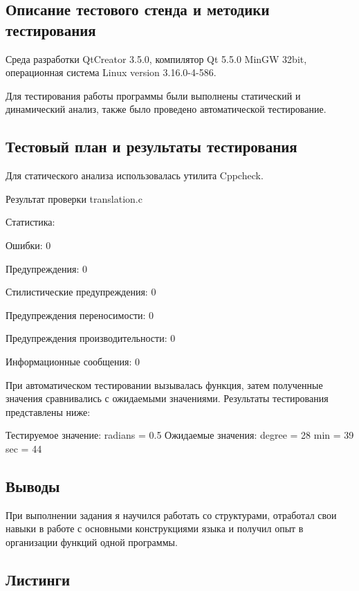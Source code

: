 \documentclass[12pt,a4paper]{report}
\begin{document}
\subsection{Описание тестового стенда и методики тестирования}
Среда разработки QtCreator 3.5.0, компилятор Qt 5.5.0 MinGW 32bit, операционная система Linux version 3.16.0-4-586.

Для тестирования работы программы были выполнены статический и динамический анализ, также было проведено автоматической тестирование.

\subsection{Тестовый план и результаты тестирования}
		Для статического анализа использовалась утилита Cppcheck.
		
		\vspace{\baselineskip}
		Результат проверки translation.c 
		
		Статистика:
		
		Ошибки:	0
		
		Предупреждения:	0
		
		Стилистические предупреждения:	0
		
		Предупреждения переносимости:	0
		
		Предупреждения производительности:	0
		
		Информационные сообщения:	0
		
		\vspace{\baselineskip}
		При автоматическом тестировании вызывалась функция, затем полученные значения сравнивались с ожидаемыми значениями. Результаты тестирования представлены ниже:  
		
		\vspace{\baselineskip}
	 
Тестируемое значение: 
	radians = 0.5
Ожидаемые значения: 
	degree = 28
	min = 39
	sec = 44
 
\subsection{Выводы}

При выполнении задания я научился работать со структурами, отработал свои навыки в работе с основными конструкциями языка и получил опыт в организации функций одной программы.

\subsection*{Листинги}
\end{document}
